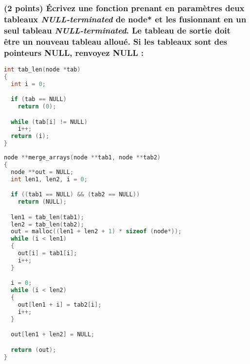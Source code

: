 \documentclass[11pt,a4paper]{article}
\begin{document}
\clearpage


\subsubsection{(2 points) \'Ecrivez une fonction prenant en paramètres deux tableaux \textit{NULL-terminated} de node* et les fusionnant en un seul tableau \textit{NULL-terminated}. Le tableau de sortie doit être un nouveau tableau alloué. Si les tableaux sont des pointeurs NULL, renvoyez NULL : }

\begin{center}
\begin{lstlisting}[language=C]
int tab_len(node *tab)
{
  int i = 0;

  if (tab == NULL)
    return (0);

  while (tab[i] != NULL)
    i++;
  return (i);
}
\end{lstlisting}

\begin{lstlisting}[language=C]
node **merge_arrays(node **tab1, node **tab2)
{
  node **out = NULL;
  int len1, len2, i = 0;

  if ((tab1 == NULL) && (tab2 == NULL))
    return (NULL);

  len1 = tab_len(tab1);
  len2 = tab_len(tab2);
  out = malloc((len1 + len2 + 1) * sizeof (node*));
  while (i < len1)
  {
    out[i] = tab1[i];
    i++;
  }

  i = 0;
  while (i < len2)
  {
    out[len1 + i] = tab2[i];
    i++;
  }

  out[len1 + len2] = NULL;

  return (out);
}
\end{lstlisting}
\end{center}
\end{document}
